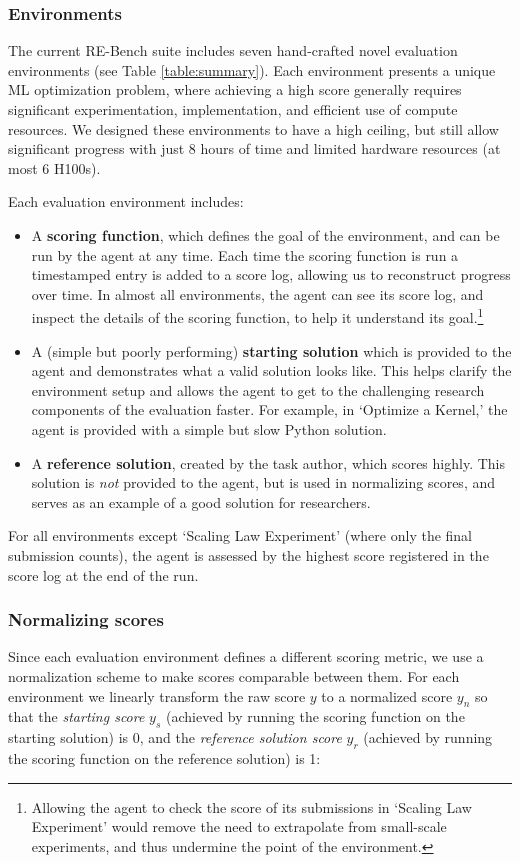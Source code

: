 \documentclass{article}
\newcommand{\EvalName}{RE-Bench}
\begin{document}
\subsubsection{Environments}

The current \EvalName{} suite includes seven hand-crafted novel evaluation environments (see Table \ref{table:summary}). Each environment presents a unique ML optimization problem, where achieving a high score generally requires significant experimentation, implementation, and efficient use of compute resources. We designed these environments to have a high ceiling, but still allow significant progress with just 8 hours of time and limited hardware resources (at most 6 H100s). 

Each evaluation environment includes:
\begin{itemize}
    \item A \textbf{scoring function}, which defines the goal of the environment, and can be run by the agent at any time. Each time the scoring function is run a timestamped entry is added to a score log, allowing us to reconstruct progress over time. In almost all environments, the agent can see its score log, and inspect the details of the scoring function, to help it understand its goal.\footnote{Allowing the agent to check the score of its submissions in `Scaling Law Experiment' would remove the need to extrapolate from small-scale experiments, and thus undermine the point of the environment.}
    \item A (simple but poorly performing) \textbf{starting solution} which is provided to the agent and demonstrates what a valid solution looks like. This helps clarify the environment setup and allows the agent to get to the challenging research components of the evaluation faster. For example, in `Optimize a Kernel,' the agent is provided with a simple but slow Python solution.
    \item A \textbf{reference solution}, created by the task author, which scores highly. This solution is \textit{not} provided to the agent, but is used in normalizing scores, and serves as an example of a good solution for researchers.
\end{itemize}

For all environments except `Scaling Law Experiment' (where only the final submission counts), the agent is assessed by the highest score registered in the score log at the end of the run. 

\subsubsection{Normalizing scores}
Since each evaluation environment defines a different scoring metric, we use a normalization scheme to make scores comparable between them. For each environment we linearly transform the raw score $y$ to a normalized score $y_n$ so that the \textit{starting score} $y_s$ (achieved by running the scoring function on the starting solution) is $0$, and the \textit{reference solution score} $y_r$ (achieved by running the scoring function on the reference solution) is 1:
\end{document}
